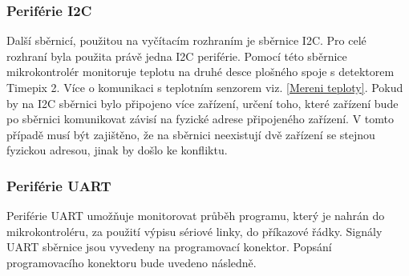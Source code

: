  	\subsubsection{Periférie I2C}
 	Další sběrnicí, použitou na vyčítacím rozhraním je sběrnice I2C. Pro celé rozhraní byla použita právě jedna I2C periférie. Pomocí této sběrnice mikrokontrolér monitoruje teplotu na druhé desce plošného spoje s detektorem Timepix 2. Více o komunikaci s teplotním senzorem viz. \ref{Mereni teploty}. Pokud by na I2C sběrnici bylo připojeno více zařízení, určení toho, které zařízení bude po sběrnici komunikovat závisí na fyzické adrese připojeného zařízení. V tomto případě musí být zajištěno, že na sběrnici neexistují dvě zařízení se stejnou fyzickou adresou, jinak by došlo ke konfliktu. 
 	
 	\subsubsection{Periférie UART}
 	\par Periférie UART umožňuje monitorovat průběh programu, který je nahrán do mikrokontroléru, za použití výpisu sériové linky, do příkazové řádky. Signály UART sběrnice jsou vyvedeny na programovací konektor. Popsání programovacího konektoru bude uvedeno následně.

